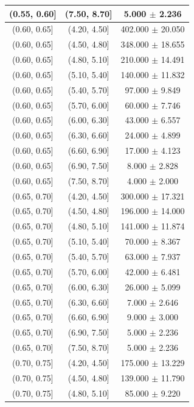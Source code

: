 \begin{longtable}{|c|c|c|}
\hline
(0.55, 0.60] & (7.50, 8.70] & 5.000 $\pm$ 2.236 \\ 
\hline
(0.60, 0.65] & (4.20, 4.50] & 402.000 $\pm$ 20.050 \\ 
\hline
(0.60, 0.65] & (4.50, 4.80] & 348.000 $\pm$ 18.655 \\ 
\hline
(0.60, 0.65] & (4.80, 5.10] & 210.000 $\pm$ 14.491 \\ 
\hline
(0.60, 0.65] & (5.10, 5.40] & 140.000 $\pm$ 11.832 \\ 
\hline
(0.60, 0.65] & (5.40, 5.70] & 97.000 $\pm$ 9.849 \\ 
\hline
(0.60, 0.65] & (5.70, 6.00] & 60.000 $\pm$ 7.746 \\ 
\hline
(0.60, 0.65] & (6.00, 6.30] & 43.000 $\pm$ 6.557 \\ 
\hline
(0.60, 0.65] & (6.30, 6.60] & 24.000 $\pm$ 4.899 \\ 
\hline
(0.60, 0.65] & (6.60, 6.90] & 17.000 $\pm$ 4.123 \\ 
\hline
(0.60, 0.65] & (6.90, 7.50] & 8.000 $\pm$ 2.828 \\ 
\hline
(0.60, 0.65] & (7.50, 8.70] & 4.000 $\pm$ 2.000 \\ 
\hline
(0.65, 0.70] & (4.20, 4.50] & 300.000 $\pm$ 17.321 \\ 
\hline
(0.65, 0.70] & (4.50, 4.80] & 196.000 $\pm$ 14.000 \\ 
\hline
(0.65, 0.70] & (4.80, 5.10] & 141.000 $\pm$ 11.874 \\ 
\hline
(0.65, 0.70] & (5.10, 5.40] & 70.000 $\pm$ 8.367 \\ 
\hline
(0.65, 0.70] & (5.40, 5.70] & 63.000 $\pm$ 7.937 \\ 
\hline
(0.65, 0.70] & (5.70, 6.00] & 42.000 $\pm$ 6.481 \\ 
\hline
(0.65, 0.70] & (6.00, 6.30] & 26.000 $\pm$ 5.099 \\ 
\hline
(0.65, 0.70] & (6.30, 6.60] & 7.000 $\pm$ 2.646 \\ 
\hline
(0.65, 0.70] & (6.60, 6.90] & 9.000 $\pm$ 3.000 \\ 
\hline
(0.65, 0.70] & (6.90, 7.50] & 5.000 $\pm$ 2.236 \\ 
\hline
(0.65, 0.70] & (7.50, 8.70] & 5.000 $\pm$ 2.236 \\ 
\hline
(0.70, 0.75] & (4.20, 4.50] & 175.000 $\pm$ 13.229 \\ 
\hline
(0.70, 0.75] & (4.50, 4.80] & 139.000 $\pm$ 11.790 \\ 
\hline
(0.70, 0.75] & (4.80, 5.10] & 85.000 $\pm$ 9.220 \\ 

\end{longtable}
